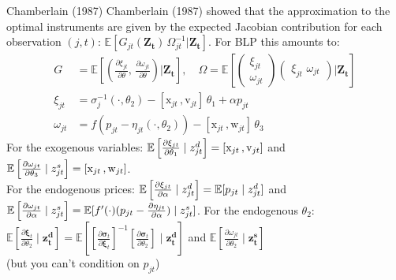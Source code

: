\begin{frame}{Chamberlain (1987)}
Chamberlain (1987) showed that the approximation to the optimal instruments are given by the expected Jacobian contribution for each observation $(j,t)$: $\mathbb{E}[G_{jt}(\symbf{Z_t})\, \Omega_{jt}^{-1} | \symbf{Z_t}]$. For BLP this amounts to:
\begin{align*}
    G&=\mathbb{E}\left[
    \left(\frac{\partial \xi_{jt}}{\partial \theta}, \,
    \frac{\partial \omega_{jt}}{\partial \theta} \right)
| \symbf{Z_t} \right], \quad 
\Omega = \mathbb{E}\left[
\begin{pmatrix}
    \xi_{jt} \\
    \omega_{jt}
\end{pmatrix}
\begin{pmatrix}
    \xi_{jt}\, \,
    \omega_{jt}
\end{pmatrix}
| \symbf{Z_t} \right] \\
\xi_{jt} &= \sigma_j^{-1}(\cdot, \theta_2) - [\mathrm{x}_{jt} \,,  \mathrm{v}_{jt}]\, \theta_1 + \alpha p_{jt}\\
\omega_{jt} &= f\left(p_{jt}- \eta_{jt}(\cdot, \theta_2)  \right) -[\mathrm{x}_{jt} \,, \mathrm{w}_{jt}]\, \theta_3 
\end{align*}
For the exogenous variables: $\mathbb{E}\left[\frac{\partial \xi_{jt}}{\partial \theta_1} \mid  z_{jt}^{d} \right]=[\mathrm{x}_{jt} \,,  \mathrm{v}_{jt}]$ and
$\mathbb{E}\left[\frac{\partial \omega_{jt}}{\partial \theta_3} \mid  z_{jt}^{s} \right]=[\mathrm{x}_{jt} \,,  \mathrm{w}_{jt}]$.\\
For the endogenous prices: $\mathbb{E}\left[\frac{\partial \xi_{jt}}{\partial \alpha} \mid  z_{jt}^{d} \right]=\mathbb{E}[p_{jt} \mid z_{jt}^d]$ and
$\mathbb{E}\left[\frac{\partial \omega_{jt}}{\partial \alpha} \mid  z_{jt}^{s} \right]=\mathbb{E}[f'(\cdot) (p_{jt} - \frac{\partial \eta_{jt}}{\partial \alpha}) \mid z_{jt}^s]$.
For the endogenous $\theta_2$: $\mathbb{E}\left[\frac{\partial \symbf{\xi}_{t}}{\partial \theta_2} \mid \symbf{z_{t}^d} \right] 
=\mathbb{E}\left[\left[\frac{\partial \symbf{\sigma}_{t}}{\partial \symbf{\xi}_t}\right]^{-1} 
\left[\frac{\partial \symbf{\sigma}_{t}}{\partial \theta_2}\right] \mid \symbf{z_{t}^d} \right]$ and $\mathbb{E}\left[\frac{\partial \omega_{jt}}{\partial \theta_2} \mid \symbf{z_{t}^s} \right]$\\ (but you can't condition on $p_{jt}$)
\end{frame}


